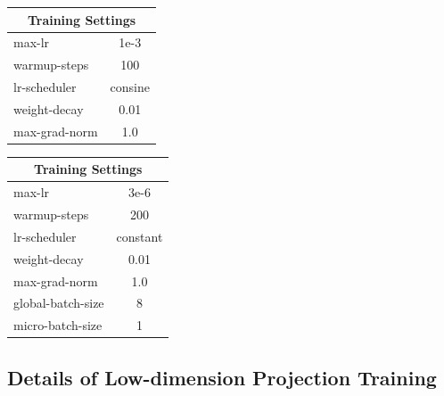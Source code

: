 \begin{table}[t]
    \centering
    \begin{minipage}[t]{0.49\linewidth}
        \centering
        \normalsize
        \setlength{\tabcolsep}{6pt}
        \renewcommand{\arraystretch}{1.10}
        \label{tab:appendix_stage1_settings}
        \begin{tabular}{lc}
            \toprule
            \multicolumn{2}{c}{\textbf{Training Settings}} \\
            \midrule
            max-lr & 1e-3 \\
            warmup-steps & 100 \\
            lr-scheduler & consine \\
            weight-decay & 0.01 \\
            max-grad-norm & 1.0 \\
            \bottomrule
        \end{tabular}
    \end{minipage}\hfill
    \begin{minipage}[t]{0.49\linewidth}
        \centering
        \normalsize
        \setlength{\tabcolsep}{6pt}
        \renewcommand{\arraystretch}{1.10}
        \label{tab:appendix_stage2_settings}
        \begin{tabular}{lc}
            \toprule
            \multicolumn{2}{c}{\textbf{Training Settings}} \\
            \midrule
            max-lr & 3e-6 \\
            warmup-steps & 200 \\
            lr-scheduler & constant \\
            weight-decay & 0.01 \\
            max-grad-norm & 1.0 \\
            global-batch-size & 8 \\
            micro-batch-size & 1 \\
            \bottomrule
        \end{tabular}
    \end{minipage}
\end{table}

\subsection{Details of Low-dimension Projection Training}
\label{appd:train_stage_1}

